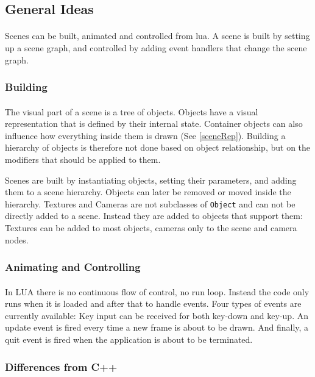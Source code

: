 \subsection{General Ideas}
\paragraph{}
Scenes can be built, animated and controlled from lua.
A scene is built by setting up a scene graph, and controlled by adding event handlers that change the scene graph.

\subsubsection{Building}
\paragraph{}
The visual part of a scene is a tree of objects.
Objects have a visual representation that is defined by their internal state.
Container objects can also influence how everything inside them is drawn (See \ref{sceneRep}).
Building a hierarchy of objects is therefore not done based on object relationship,
but on the modifiers that should be applied to them.

Scenes are built by instantiating objects, setting their parameters, and adding them to a scene hierarchy.
Objects can later be removed or moved inside the hierarchy.
Textures and Cameras are not subclasses of \lstinline{Object} and can not be directly added to a scene.
Instead they are added to objects that support them:
Textures can be added to most objects, cameras only to the scene and camera nodes.

\subsubsection{Animating and Controlling}
\paragraph{}
In LUA there is no continuous flow of control, no run loop. Instead the code only runs when it is loaded and after that to handle events.
Four types of events are currently available: Key input can be received for both key-down and key-up. An update event is fired every time a new frame is about to be drawn. And finally, a quit event is fired when the application is about to be terminated.

\subsubsection{Differences from C++}
